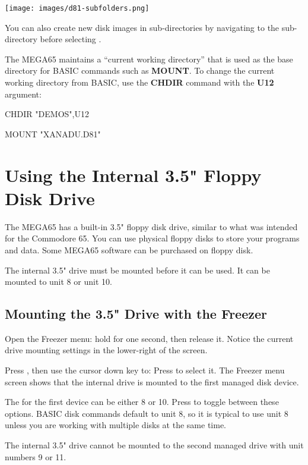 \begin{center}
  \texttt{[image: images/d81-subfolders.png]}
\end{center}

You can also create new disk images in sub-directories by navigating to the sub-directory before selecting .

The MEGA65 maintains a ``current working directory'' that is used as the base directory for BASIC commands such as {\bf MOUNT}. To change the current working directory from BASIC, use the {\bf CHDIR} command with the {\bf U12} argument:

\begin{screenoutput}
CHDIR "DEMOS",U12

MOUNT "XANADU.D81"
\end{screenoutput}


\section{Using the Internal 3.5" Floppy Disk Drive}

The MEGA65 has a built-in 3.5" floppy disk drive, similar to what was intended for the Commodore 65. You can use physical floppy disks to store your programs and data. Some MEGA65 software can be purchased on floppy disk.

The internal 3.5" drive must be mounted before it can be used. It can be mounted to unit 8 or unit 10.

\subsection{Mounting the 3.5" Drive with the Freezer}

Open the Freezer menu: hold  for one second, then release it. Notice the current drive mounting settings in the lower-right of the screen.

Press , then use the cursor down key to:  Press  to select it. The Freezer menu screen shows that the internal drive is mounted to the first managed disk device.

The  for the first device can be either 8 or 10. Press  to toggle between these options. BASIC disk commands default to unit 8, so it is typical to use unit 8 unless you are working with multiple disks at the same time.

The internal 3.5" drive cannot be mounted to the second managed drive with unit numbers 9 or 11.

